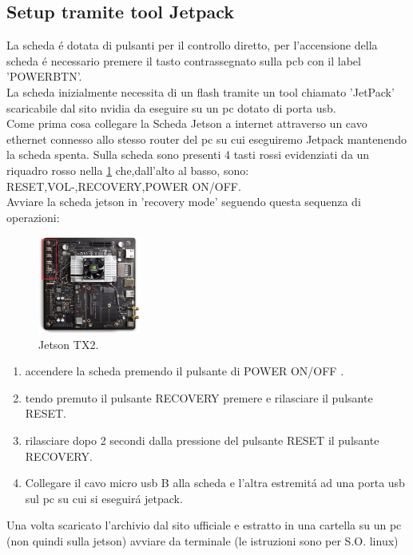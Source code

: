 \documentclass[a4paper]{article}
\begin{document}
\subsection{Setup tramite tool Jetpack}
La scheda é dotata di pulsanti per il controllo diretto, per l'accensione della scheda é necessario premere il tasto contrassegnato sulla pcb con il label 'POWERBTN'.\\
La scheda inizialmente necessita di un flash tramite un tool chiamato 'JetPack' scaricabile dal sito nvidia da eseguire su un pc dotato di porta usb.\\
Come prima cosa collegare la Scheda Jetson a internet attraverso un cavo ethernet connesso allo stesso router del pc su cui eseguiremo Jetpack mantenendo la scheda spenta.
Sulla scheda sono presenti 4 tasti rossi evidenziati da un riquadro rosso nella \ref{fig:jetsonTX2} che,dall'alto al basso, sono: RESET,VOL-,RECOVERY,POWER ON/OFF.\\
Avviare la scheda jetson in 'recovery mode' seguendo questa sequenza di operazioni:\\
\vspace{-10pt}
\begin{figure}
    \centering
    
    \includegraphics [width=0.3\textwidth] {NVIDIA_Jetson_TX2_Module_Devkit.png}
   
    \caption{Jetson TX2.}
    \label{fig:jetsonTX2}
\end{figure}
\begin{enumerate} 
    \item accendere la scheda premendo il pulsante di POWER ON/OFF .
    \item tendo premuto il pulsante RECOVERY premere e rilasciare il pulsante RESET.
    \item rilasciare dopo 2 secondi dalla pressione del pulsante RESET il pulsante RECOVERY.
    \item Collegare il cavo micro usb B alla scheda e l'altra estremitá ad una porta usb sul pc su cui si eseguirá jetpack. 
\end{enumerate}
Una volta scaricato l'archivio dal sito ufficiale e estratto in una cartella su un pc (non quindi sulla jetson) avviare da terminale (le istruzioni sono per S.O. linux)
\end{document}
